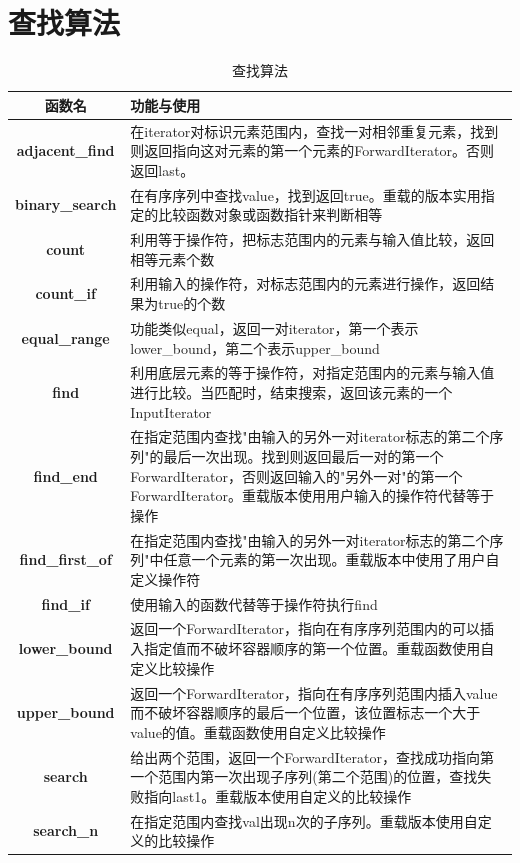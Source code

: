 \documentclass[UTF8,a4paper,12pt]{ctexbook}
\begin{document}
	\section{查找算法}
	\begin{table}[H]
		\centering
		\caption{查找算法}
		\begin{tabular}{c|m{13cm}}
			\hline 
			函数名 & 功能与使用\\
			\hline
			\textbf{adjacent\_find}	& 在iterator对标识元素范围内，查找一对相邻重复元素，找到则返回指向这对元素的第一个元素的ForwardIterator。否则返回last。\\
			\hline 
			\textbf{binary\_search}  & 在有序序列中查找value，找到返回true。重载的版本实用指定的比较函数对象或函数指针来判断相等\\
			\hline 
			\textbf{count}  & 利用等于操作符，把标志范围内的元素与输入值比较，返回相等元素个数\\
			\hline 
			\textbf{count\_if}  & 利用输入的操作符，对标志范围内的元素进行操作，返回结果为true的个数\\
			\hline 
			\textbf{equal\_range}  & 功能类似equal，返回一对iterator，第一个表示lower\_bound，第二个表示upper\_bound\\
			\hline 
			\textbf{find}	&利用底层元素的等于操作符，对指定范围内的元素与输入值进行比较。当匹配时，结束搜索，返回该元素的一个InputIterator	\\
			\hline 
			\textbf{find\_end}	& 在指定范围内查找"由输入的另外一对iterator标志的第二个序列"的最后一次出现。找到则返回最后一对的第一个ForwardIterator，否则返回输入的"另外一对"的第一个ForwardIterator。重载版本使用用户输入的操作符代替等于操作	\\
			\hline 
			\textbf{find\_first\_of}	&在指定范围内查找"由输入的另外一对iterator标志的第二个序列"中任意一个元素的第一次出现。重载版本中使用了用户自定义操作符	\\
			\hline 
			\textbf{find\_if}	&使用输入的函数代替等于操作符执行find	\\
			\hline 
			\textbf{lower\_bound}	&返回一个ForwardIterator，指向在有序序列范围内的可以插入指定值而不破坏容器顺序的第一个位置。重载函数使用自定义比较操作	\\
			\hline 
			\textbf{upper\_bound}		&返回一个ForwardIterator，指向在有序序列范围内插入value而不破坏容器顺序的最后一个位置，该位置标志一个大于value的值。重载函数使用自定义比较操作	\\
			\hline 
			\textbf{search}	& 给出两个范围，返回一个ForwardIterator，查找成功指向第一个范围内第一次出现子序列(第二个范围)的位置，查找失败指向last1。重载版本使用自定义的比较操作	\\
			\hline 
			\textbf{search\_n}	& 在指定范围内查找val出现n次的子序列。重载版本使用自定义的比较操作\\
			\hline
		\end{tabular}
	\end{table}	
\end{document}
